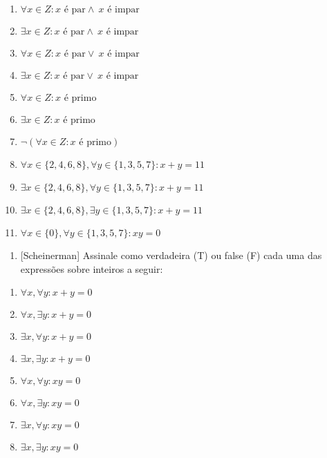 \begin{enumerate}
\def\labelenumi{\alph{enumi}.}
\item
  \(\forall x \in Z : x \text{ é par} \land\ x \text{ é impar}\)
\item
  \(\exists x \in Z : x \text{ é par} \land\ x \text{ é impar}\)
\item
  \(\forall x \in Z : x \text{ é par} \lor\ x \text{ é impar}\)
\item
  \(\exists x \in Z : x \text{ é par} \lor\ x \text{ é impar}\)
\item
  \(\forall x \in Z : x \text{ é primo}\)
\item
  \(\exists x \in Z : x \text{ é primo}\)
\item
  \(\neg(\forall x \in Z : x \text{ é primo} )\)
\item
  \(\forall x \in \{2,4,6,8\}, \forall y \in \{1,3,5,7\} : x + y = 11\)
\item
  \(\exists x \in \{2,4,6,8\}, \forall y \in \{1,3,5,7\} : x + y = 11\)
\item
  \(\exists x \in \{2,4,6,8\}, \exists y \in \{1,3,5,7\} : x + y = 11\)
\item
  \(\forall x \in \{0\}, \forall y \in \{1,3,5,7\} : xy = 0\)
\end{enumerate}

\begin{enumerate}
\def\labelenumi{\arabic{enumi}.}
\setcounter{enumi}{2}
\item
  {[}Scheinerman{]} Assinale como verdadeira (T) ou false (F) cada uma
  das expressões sobre inteiros a seguir:
\end{enumerate}

\begin{enumerate}
\def\labelenumi{\alph{enumi}.}
\item
  \(\forall x, \forall y : x + y = 0\)
\item
  \(\forall x, \exists y : x + y = 0\)
\item
  \(\exists x, \forall y : x + y = 0\)
\item
  \(\exists x, \exists y : x + y = 0\)
\item
  \(\forall x, \forall y : xy = 0\)
\item
  \(\forall x, \exists y : xy = 0\)
\item
  \(\exists x, \forall y : xy = 0\)
\item
  \(\exists x, \exists y : xy = 0\)
\end{enumerate}

